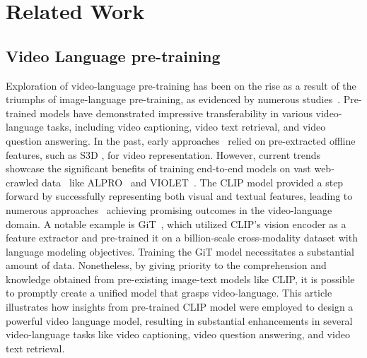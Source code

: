 \documentclass{article}
\begin{document}
\section{Related Work}

\subsection{Video Language pre-training}

Exploration of video-language pre-training has been on the rise as a result of the triumphs of image-language pre-training, as evidenced by numerous studies~\cite{jia2021scaling,yao2021filip,yuan2021florence,yang2022unified,wang2021simvlm,chen2022pali,wang2022image,wang2022ofa,cho2021unifying,bao2022vlmo,dou2022empirical,huang2020pixel}. Pre-trained models have demonstrated impressive transferability in various video-language tasks, including video captioning, video text retrieval, and video question answering. In the past, early approaches~\cite{sun2019videobert,zhu2020actbert,li2020hero,miech2019howto100m} relied on pre-extracted offline features, such as S3D \cite{2020End}, for video representation. However, current trends showcase the significant benefits of training end-to-end models on vast web-crawled data~\cite{zellers2021merlot,bain2021frozen} like ALPRO~\cite{li2022align} and VIOLET~\cite{fu2021violet}. The CLIP model provided a step forward by successfully representing both visual and textual features, leading to numerous approaches~\cite{luo2022clip4clip,gao2021clip2tv,zhao2022centerclip,fang2021clip2video} achieving promising outcomes in the video-language domain. A notable example is GiT~\cite{wang2022git}, which utilized CLIP's vision encoder as a feature extractor and pre-trained it on a billion-scale cross-modality dataset with language modeling objectives. 
Training the GiT model necessitates a substantial amount of data. Nonetheless, by giving priority to the comprehension and knowledge obtained from pre-existing image-text models like CLIP, it is possible to promptly create a unified model that grasps video-language. This article illustrates how insights from pre-trained CLIP model were employed to design a powerful video language model, resulting in substantial enhancements in several video-language tasks like video captioning, video question answering, and video text retrieval.
\end{document}
